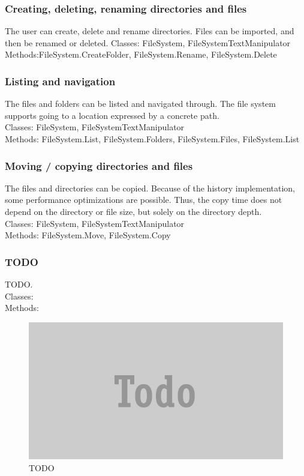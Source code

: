\documentclass[JCDReport.tex]{subfiles}
\begin{document}
\subsubsection{Creating, deleting, renaming directories and files}
The user can create, delete and rename directories. Files can be imported, and then be renamed or deleted.
Classes: FileSystem, FileSystemTextManipulator\\
Methods:FileSystem.CreateFolder, FileSystem.Rename, FileSystem.Delete

\subsubsection{Listing and navigation}
The files and folders can be listed and navigated through. The file system supports going to a location expressed by a concrete path.\\
Classes: FileSystem, FileSystemTextManipulator\\
Methods: FileSystem.List, FileSystem.Folders, FileSystem.Files, FileSystem.List

\subsubsection{Moving / copying directories and files}
The files and directories can be copied. Because of the history implementation, some performance optimizations are possible. Thus, the copy time does not depend on the directory or file size, but solely on the directory depth.\\
Classes: FileSystem, FileSystemTextManipulator\\
Methods: FileSystem.Move, FileSystem.Copy

\subsubsection{TODO}
TODO.\\
Classes:\\
Methods:\\
\begin{figure}[h!]
	\centering
	\includegraphics[scale=1]{Images/todo.png} 
	\caption{TODO}
\end{figure}
\end{document}
